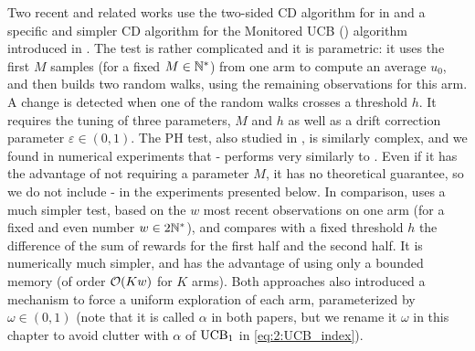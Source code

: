 Two recent and related works use
the two-sided \CUSUM{} CD algorithm for \CUSUMUCB{} in \cite{LiuLeeShroff17}
and a specific and simpler CD algorithm for the Monitored UCB (\MUCB) algorithm introduced in \cite{CaoZhenKvetonXie18}.
%
The \CUSUM{} test is rather complicated and it is parametric: it uses the first $M$ samples (for a fixed $M\in\mathbb{N}^*$) from one arm to compute an average $\widehat{u_0}$, and then builds two random walks, using the remaining observations for this arm. A change is detected when one of the random walks crosses a threshold $h$.
It requires the tuning of three parameters, $M$ and $h$ as well as a drift correction parameter $\varepsilon\in(0,1)$.
The PH test, also studied in \cite{LiuLeeShroff17}, is similarly complex,
and we found in numerical experiments that \PHT-\UCB{} performs very similarly to \CUSUMUCB.
Even if it has the advantage of not requiring a parameter $M$,
it has no theoretical guarantee, so we do not include \PHT-\UCB{} in the experiments presented below.
%
In comparison, \MUCB{} uses a much simpler test, based on the $w$ most recent observations on one arm (for a fixed and even number $w\in 2\mathbb{N}^*$), and compares with a fixed threshold $h$ the difference of the sum of rewards for the first half and the second half. It is numerically much simpler, and has the advantage of using only a bounded memory (of order $\mathop{}\mathopen{}\mathcal{O}\mathopen{}\left(K w\right)$ for $K$ arms).
%
Both approaches also introduced a mechanism to force a uniform exploration of each arm, parameterized by $\omega\in(0,1)$ (note that it is called $\alpha$ in both papers, but we rename it $\omega$ in this chapter to avoid clutter with $\alpha$ of $\mathrm{UCB}_1$ in \eqref{eq:2:UCB_index}).

